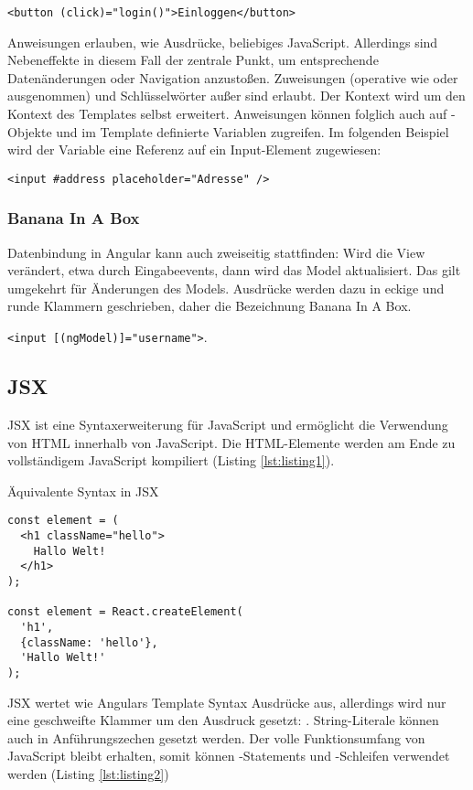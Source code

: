 \texttt{<button (click)="login()">Einloggen</button>}

Anweisungen erlauben, wie Ausdrücke, beliebiges JavaScript. Allerdings sind Nebeneffekte in diesem Fall der zentrale Punkt, um entsprechende Datenänderungen oder Navigation anzustoßen. Zuweisungen (operative wie \inlinecode{+=} oder \inlinecode{-=} ausgenommen) und Schlüsselwörter außer  sind erlaubt.
Der Kontext wird um den Kontext des Templates selbst erweitert. Anweisungen können folglich auch auf -Objekte und im Template definierte Variablen zugreifen. Im folgenden Beispiel wird der Variable  eine Referenz auf ein Input-Element zugewiesen: 

\texttt{<input #address placeholder="Adresse" />}

\subsubsection{Banana In A Box}
Datenbindung in Angular kann auch zweiseitig stattfinden: Wird die View verändert, etwa durch Eingabeevents, dann wird das Model aktualisiert. Das gilt umgekehrt für Änderungen des Models. Ausdrücke werden dazu in eckige und runde Klammern geschrieben, daher die Bezeichnung \glqq Banana In A Box\grqq. 

\texttt{<input [(ngModel)]="username">}.

\subsection{JSX}
JSX ist eine Syntaxerweiterung für JavaScript und ermöglicht die Verwendung von HTML innerhalb von JavaScript. Die HTML-Elemente werden am Ende zu vollständigem JavaScript kompiliert (Listing \ref{lst:listing1}).

\begin{listing}
\caption{Äquivalente Syntax in JSX}
\label{lst:listing1}
\begin{verbatim}
const element = (
  <h1 className="hello">
    Hallo Welt!
  </h1>
);

const element = React.createElement(
  'h1',
  {className: 'hello'},
  'Hallo Welt!'
);
\end{verbatim}
\end{listing}

JSX wertet wie Angulars Template Syntax Ausdrücke aus, allerdings wird nur eine geschweifte Klammer um den Ausdruck gesetzt: . String-Literale können auch in Anführungszechen gesetzt werden. Der volle Funktionsumfang von JavaScript bleibt erhalten, somit können -Statements und -Schleifen verwendet werden (Listing \ref{lst:listing2})

